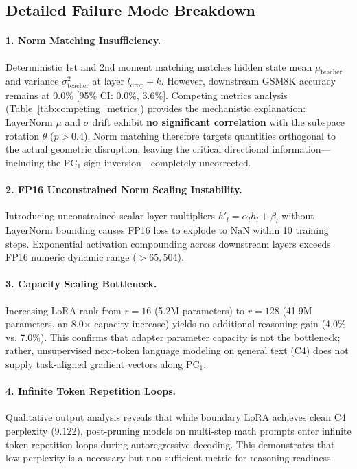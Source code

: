 \documentclass[11pt]{article}
\begin{document}
\subsection{Detailed Failure Mode Breakdown}

\paragraph{1. Norm Matching Insufficiency.}
Deterministic 1st and 2nd moment matching matches hidden state mean $\mu_{\text{teacher}}$ and variance $\sigma_{\text{teacher}}^2$ at layer $l_{\text{drop}}+k$. However, downstream GSM8K accuracy remains at 0.0\% [95\% CI: 0.0\%, 3.6\%]. Competing metrics analysis (Table~\ref{tab:competing_metrics}) provides the mechanistic explanation: LayerNorm $\mu$ and $\sigma$ drift exhibit \textbf{no significant correlation} with the subspace rotation $\theta$ ($p > 0.4$). Norm matching therefore targets quantities orthogonal to the actual geometric disruption, leaving the critical directional information---including the $\mathrm{PC}_1$ sign inversion---completely uncorrected.

\paragraph{2. FP16 Unconstrained Norm Scaling Instability.}
Introducing unconstrained scalar layer multipliers $h'_{l} = \alpha_l h_l + \beta_l$ without LayerNorm bounding causes FP16 loss to explode to $\text{NaN}$ within 10 training steps. Exponential activation compounding across downstream layers exceeds FP16 numeric dynamic range ($>65,504$).

\paragraph{3. Capacity Scaling Bottleneck.}
Increasing LoRA rank from $r=16$ (5.2M parameters) to $r=128$ (41.9M parameters, an 8.0$\times$ capacity increase) yields no additional reasoning gain (4.0\% vs. 7.0\%). This confirms that adapter parameter capacity is not the bottleneck; rather, unsupervised next-token language modeling on general text (C4) does not supply task-aligned gradient vectors along $\mathrm{PC}_1$.

\paragraph{4. Infinite Token Repetition Loops.}
Qualitative output analysis reveals that while boundary LoRA achieves clean C4 perplexity (9.122), post-pruning models on multi-step math prompts enter infinite token repetition loops during autoregressive decoding. This demonstrates that low perplexity is a necessary but non-sufficient metric for reasoning readiness.
\end{document}
